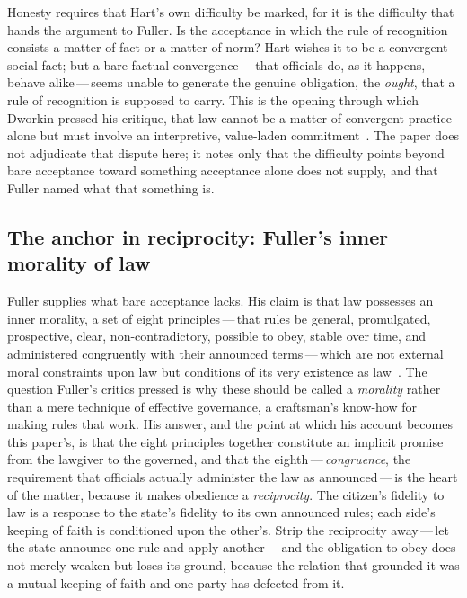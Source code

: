 Honesty requires that Hart's own difficulty be marked, for it is the difficulty that hands the argument to Fuller. Is the acceptance in which the rule of recognition consists a matter of fact or a matter of norm? Hart wishes it to be a convergent social fact; but a bare factual convergence\,---\,that officials do, as it happens, behave alike\,---\,seems unable to generate the genuine obligation, the \emph{ought}, that a rule of recognition is supposed to carry. This is the opening through which Dworkin pressed his critique, that law cannot be a matter of convergent practice alone but must involve an interpretive, value-laden commitment~\parencite{dworkin1986}. The paper does not adjudicate that dispute here; it notes only that the difficulty points beyond bare acceptance toward something acceptance alone does not supply, and that Fuller named what that something is.

\subsection{The anchor in reciprocity: Fuller's inner morality of law}
\label{p13:sub:jur-fuller}

Fuller supplies what bare acceptance lacks. His claim is that law possesses an inner morality, a set of eight principles\,---\,that rules be general, promulgated, prospective, clear, non-contradictory, possible to obey, stable over time, and administered congruently with their announced terms\,---\,which are not external moral constraints upon law but conditions of its very existence as law~\parencite{fuller1969}. The question Fuller's critics pressed is why these should be called a \emph{morality} rather than a mere technique of effective governance, a craftsman's know-how for making rules that work. His answer, and the point at which his account becomes this paper's, is that the eight principles together constitute an implicit promise from the lawgiver to the governed, and that the eighth\,---\,\emph{congruence}, the requirement that officials actually administer the law as announced\,---\,is the heart of the matter, because it makes obedience a \emph{reciprocity}. The citizen's fidelity to law is a response to the state's fidelity to its own announced rules; each side's keeping of faith is conditioned upon the other's. Strip the reciprocity away\,---\,let the state announce one rule and apply another\,---\,and the obligation to obey does not merely weaken but loses its ground, because the relation that grounded it was a mutual keeping of faith and one party has defected from it.


